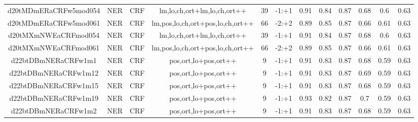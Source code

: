 \documentclass[a4paper]{article}
\begin{document}
\begin{landscape}
\begin{center}
\begin{tabular}{ |c|c|c|c|c|c|c|c|c|c|c|c|}
 	

 
 	
 	\small{ d20tMDmERaCRFw5mod054 } & \small{ NER} & \small{  CRF }  & lm,lo,ch,ort+lm,lo,ch,ort++  &  39 &  \small{  -1:+1 }  &  0.91 & 0.84 & 0.87  &  0.68 & 0.6 & 0.63 \\
 	

 
 	
 	\small{ d20tMDmERaCRFw5mod061 } & \small{ NER} & \small{  CRF }  & lm,pos,lo,ch,ort+pos,lo,ch,ort++  &  66 &  \small{  -2:+2 }  &  0.89 & 0.85 & 0.87  &  0.66 & 0.61 & 0.63 \\
 	

 
 	
 	\small{ d20tMXmNWEaCRFmod054 } & \small{ NER} & \small{  CRF }  & lm,lo,ch,ort+lm,lo,ch,ort++  &  39 &  \small{  -1:+1 }  &  0.91 & 0.84 & 0.87  &  0.68 & 0.6 & 0.63 \\
 	

 
 	
 	\small{ d20tMXmNWEaCRFmod061 } & \small{ NER} & \small{  CRF }  & lm,pos,lo,ch,ort+pos,lo,ch,ort++  &  66 &  \small{  -2:+2 }  &  0.89 & 0.85 & 0.87  &  0.66 & 0.61 & 0.63 \\
 	

 
 	
 	\small{ d22btDBmNERaCRFw1m1 } & \small{ NER} & \small{  CRF }  & pos,ort,lo+pos,ort++  &  9 &  \small{  -1:+1 }  &  0.91 & 0.83 & 0.87  &  0.68 & 0.59 & 0.63 \\
 	

 
 	
 	\small{ d22btDBmNERaCRFw1m12 } & \small{ NER} & \small{  CRF }  & pos,ort,lo+pos,ort++  &  9 &  \small{  -1:+1 }  &  0.91 & 0.83 & 0.87  &  0.69 & 0.59 & 0.63 \\
 	

 
 	
 	\small{ d22btDBmNERaCRFw1m15 } & \small{ NER} & \small{  CRF }  & pos,ort,lo+pos,ort++  &  9 &  \small{  -1:+1 }  &  0.91 & 0.83 & 0.87  &  0.68 & 0.59 & 0.63 \\
 	

 
 	
 	\small{ d22btDBmNERaCRFw1m19 } & \small{ NER} & \small{  CRF }  & pos,ort,lo+pos,ort++  &  9 &  \small{  -1:+1 }  &  0.93 & 0.82 & 0.87  &  0.7 & 0.59 & 0.63 \\
 	

 
 	
 	\small{ d22btDBmNERaCRFw1m2 } & \small{ NER} & \small{  CRF }  & pos,ort,lo+pos,ort++  &  9 &  \small{  -1:+1 }  &  0.91 & 0.83 & 0.87  &  0.68 & 0.59 & 0.63 \\
 	


\end{tabular}
\end{center}
\end{landscape}
\end{document}
